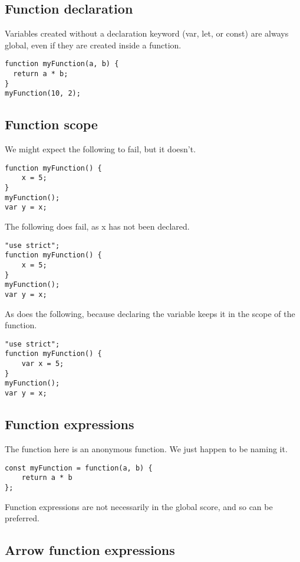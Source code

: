 
\subsection{Function declaration}

Variables created without a declaration keyword (var, let, or const) are always global, even if they are created inside a function.

\begin{verbatim}
function myFunction(a, b) {
  return a * b;
}
myFunction(10, 2);
\end{verbatim}

\subsection{Function scope}

We might expect the following to fail, but it doesn't.

\begin{verbatim}
function myFunction() {
    x = 5;
}
myFunction();
var y = x;
\end{verbatim}

The following does fail, as x has not been declared.

\begin{verbatim}
"use strict";
function myFunction() {
    x = 5;
}
myFunction();
var y = x;
\end{verbatim}

As does the following, because declaring the variable keeps it in the scope of the function.

\begin{verbatim}
"use strict";
function myFunction() {
    var x = 5;
}
myFunction();
var y = x;
\end{verbatim}


\subsection{Function expressions}

The function here is an anonymous function. We just happen to be naming it.

\begin{verbatim}
const myFunction = function(a, b) {
    return a * b
};
\end{verbatim}

Function expressions are not necessarily in the global score, and so can be preferred.

\subsection{Arrow function expressions}

